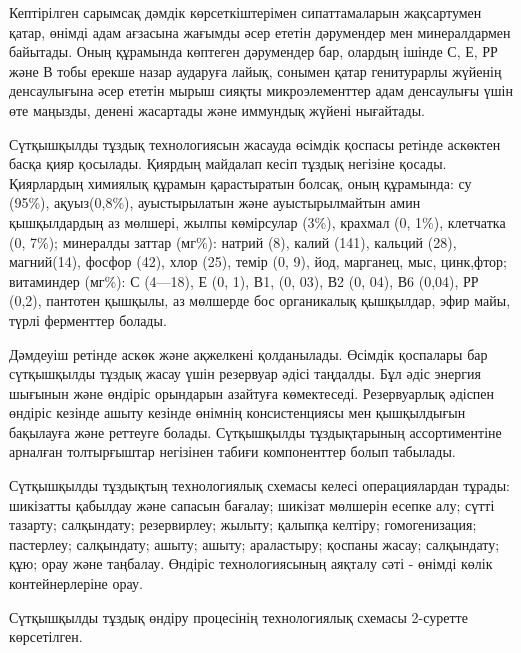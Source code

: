 {Кептірілген сарымсақ дәмдік көрсеткіштерімен сипаттамаларын жақсартумен
қатар, өнімді адам ағзасына жағымды әсер ететін дәрумендер мен
минералдармен байытады. Оның құрамында көптеген дәрумендер бар, олардың
ішінде С, Е, РР және В тобы ерекше назар аударуға лайық, сонымен қатар
генитурарлы жүйенің денсаулығына әсер ететін мырыш сияқты
микроэлементтер адам денсаулығы үшін өте маңызды, денені жасартады және
иммундық жүйені нығайтады.

Сүтқышқылды тұздық технологиясын жасауда өсімдік қоспасы ретінде
аскөктен басқа қияр қосылады. Қиярдың майдалап кесіп тұздық негізіне
қосады. Қиярлардың химиялық құрамын қарастыратын болсақ, оның құрамында:
су (95\%), ақуыз(0,8\%), ауыстырылатын және ауыстырылмайтын амин
қышқылдардың аз мөлшері, жылпы көмірсулар (3\%), крахмал (0, 1\%),
клетчатка (0, 7\%); минералды заттар (мг\%): натрий (8), калий (141),
кальций (28), магний(14), фосфор (42), хлор (25), темір (0, 9), йод,
марганец, мыс, цинк,фтор; витаминдер (мг\%): С (4---18), Е (0, 1), В1,
(0, 03), В2 (0, 04), В6 (0,04), РР (0,2), пантотен қышқылы, аз мөлшерде
бос органикалық қышқылдар, эфир майы, түрлі ферменттер болады.

Дәмдеуіш ретінде аскөк және ақжелкені қолданылады. Өсімдік қоспалары бар
сүтқышқылды тұздық жасау үшін резервуар әдісі таңдалды. Бұл әдіс энергия
шығынын және өндіріс орындарын азайтуға көмектеседі. Резервуарлық
әдіспен өндіріс кезінде ашыту кезінде өнімнің консистенциясы мен
қышқылдығын бақылауға және реттеуге болады. Сүтқышқылды тұздықтарының
ассортиментіне арналған толтырғыштар негізінен табиғи компоненттер болып
табылады.

Сүтқышқылды тұздықтың технологиялық схемасы келесі операциялардан
тұрады: шикізатты қабылдау және сапасын бағалау; шикізат мөлшерін есепке
алу; сүтті тазарту; салқындату; резервирлеу; жылыту; қалыпқа келтіру;
гомогенизация; пастерлеу; салқындату; ашыту; ашыту; араластыру; қоспаны
жасау; салқындату; құю; орау және таңбалау. Өндіріс технологиясының
аяқталу сәті - өнімді көлік контейнерлеріне орау.

Сүтқышқылды тұздық өндіру процесінің технологиялық схемасы 2-суретте
көрсетілген.

}
